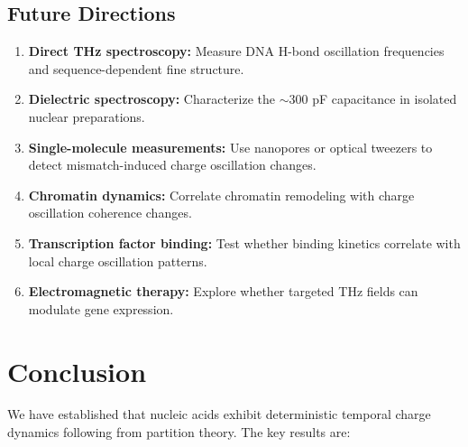 \documentclass[twocolumn,10pt]{article}
\theoremstyle{remark}
\begin{document}
\subsection{Future Directions}

\begin{enumerate}
\item \textbf{Direct THz spectroscopy:} Measure DNA H-bond oscillation frequencies and sequence-dependent fine structure.

\item \textbf{Dielectric spectroscopy:} Characterize the $\sim$300 pF capacitance in isolated nuclear preparations.

\item \textbf{Single-molecule measurements:} Use nanopores or optical tweezers to detect mismatch-induced charge oscillation changes.

\item \textbf{Chromatin dynamics:} Correlate chromatin remodeling with charge oscillation coherence changes.

\item \textbf{Transcription factor binding:} Test whether binding kinetics correlate with local charge oscillation patterns.

\item \textbf{Electromagnetic therapy:} Explore whether targeted THz fields can modulate gene expression.
\end{enumerate}

\section{Conclusion}

We have established that nucleic acids exhibit deterministic temporal charge dynamics following from partition theory. The key results are:
\end{document}
